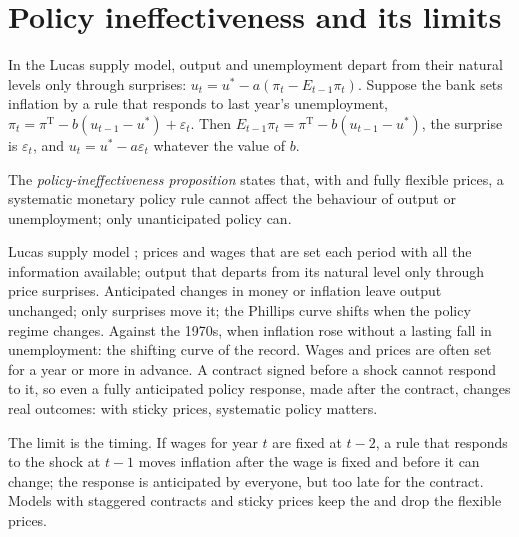 \section{Policy ineffectiveness and its limits}\label{sec:b2:expectations-and-lucas-critique:pip}

In the Lucas supply model, output and unemployment depart from their natural levels only through surprises:
$u_t = u^* - a(\pi_t - E_{t-1}\pi_t)$. Suppose the bank sets inflation by a rule that responds to last year's unemployment, $\pi_t = \pi^{\mathrm T} - b(u_{t-1} - u^*) + \varepsilon_t$. Then $E_{t-1}\pi_t = \pi^{\mathrm T} - b(u_{t-1} - u^*)$,
the surprise is $\varepsilon_t$, and $u_t = u^* - a\varepsilon_t$ whatever the value of $b$.

\begin{definition}\label{def:b2:expectations-and-lucas-critique:pip}
The \emph{policy-ineffectiveness proposition} states that, with  and fully flexible prices, a systematic monetary policy rule cannot affect the behaviour of output or
unemployment; only unanticipated policy can.
\end{definition}

\begin{model}{Lucas supply model}
\assumes {}; prices and wages that are set each period with all the information available; output that
departs from its natural level only through price surprises.
\predicts Anticipated changes in money or inflation leave output unchanged; only surprises move it; the Phillips curve
shifts when the policy regime changes.
\tested Against the 1970s, when inflation rose without a lasting fall in unemployment: the shifting curve of the record.
\breaks Wages and prices are often set for a year or more in advance. A contract signed before a shock cannot respond to it,
so even a fully anticipated policy response, made after the contract, changes real outcomes: with sticky prices, systematic
policy matters.
\end{model}

The limit is the timing. If wages for year $t$ are fixed at $t - 2$, a rule that responds to the shock at $t - 1$ moves inflation after the
wage is fixed and before it can change; the response is anticipated by everyone, but too late for the contract. Models with
staggered contracts and sticky prices keep the  and drop the flexible prices.

